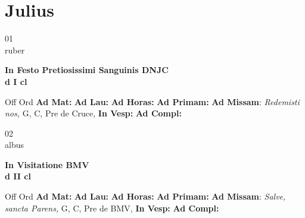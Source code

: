 \documentclass[10pt, openany]{book}
\begin{document}
    \chapter{Julius}
                    
    \begin{center}
        \begin{minipage}{3.5in}
            \vspace{2em}
            \begin{minipage}{0.5in}
                {\Huge 01} \\
                {\normalsize ruber}
            \end{minipage}
            \begin{minipage}{3.0in}
                \textbf{ \large In Festo Pretiosissimi Sanguinis DNJC \\
                \textnormal{\normalsize d I cl}}

            \end{minipage}
            \begin{justify}Off Ord
                \textbf{Ad Mat: }
                \textbf{Ad Lau: }
                \textbf{Ad Horas: }
                \textbf{Ad Primam: }\textbf{Ad Missam}: \textit{Redemisti nos,} G, C, Pre de Cruce, 
                \textbf{In Vesp: }
                \textbf{Ad Compl: }
            \end{justify}
        \end{minipage}
    \end{center}

    \begin{center}
        \begin{minipage}{3.5in}
            \vspace{2em}
            \begin{minipage}{0.5in}
                {\Huge 02} \\
                {\normalsize albus}
            \end{minipage}
            \begin{minipage}{3.0in}
                \textbf{ \large In Visitatione BMV \\
                \textnormal{\normalsize d II cl}}

            \end{minipage}
            \begin{justify}Off Ord
                \textbf{Ad Mat: }
                \textbf{Ad Lau: }
                \textbf{Ad Horas: }
                \textbf{Ad Primam: }\textbf{Ad Missam}: \textit{Salve, sancta Parens,} G, C, Pre de BMV, 
                \textbf{In Vesp: }
                \textbf{Ad Compl: }
            \end{justify}
        \end{minipage}
    \end{center}
\end{document}
